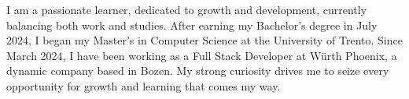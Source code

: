 
\begin{cvparagraph}

	I am a passionate learner, dedicated to growth and development, currently balancing both work and studies. After earning my Bachelor's degree in July 2024, I began my Master's in Computer Science at the University of Trento. Since March 2024, I have been working as a Full Stack Developer at Würth Phoenix, a dynamic company based in Bozen. My strong curiosity drives me to seize every opportunity for growth and learning that comes my way.

\end{cvparagraph}

